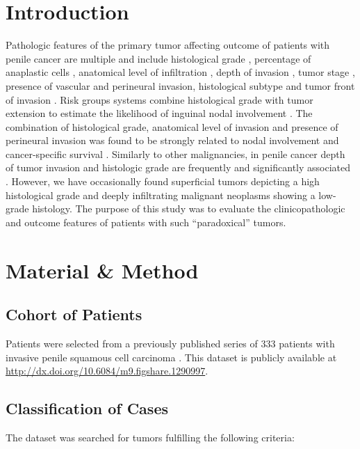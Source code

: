 \documentclass[11pt,letterpaper]{article}\usepackage[]{graphicx}\usepackage[]{color}
\begin{document}
\begin{multicols}{2}

\section*{Introduction}
Pathologic features of the primary tumor affecting outcome of patients with penile cancer are multiple and include histological grade \cite{Chaux2009,Chaux2009b,Velazquez2008}, percentage of anaplastic cells \cite{Slaton2001}, anatomical level of infiltration \cite{Chaux2009}, depth of invasion \cite{Dai2006,Emerson2001}, tumor stage \cite{Slaton2001,Dai2006,Guimaraes2006}, presence of vascular \cite{Slaton2001,Emerson2001,Guimaraes2006,Ficarra2005} and perineural \cite{Chaux2009,Velazquez2008} invasion, histological subtype \cite{Dai2006,Guimaraes2009} and tumor front of invasion \cite{Guimaraes2006}. Risk groups systems combine histological grade with tumor extension to estimate the likelihood of inguinal nodal involvement \cite{Solsona2001,Solsona2004,Hungerhuber2006,Ornellas2008}. The combination of histological grade, anatomical level of invasion and presence of perineural invasion was found to be strongly related to nodal involvement and cancer-specific survival \cite{Chaux2009}. Similarly to other malignancies, in penile cancer depth of tumor invasion and histologic grade are frequently and significantly associated \cite{Guimaraes2009}. However, we have occasionally found superficial tumors depicting a high histological grade and deeply infiltrating malignant neoplasms showing a low-grade histology. The purpose of this study was to evaluate the clinicopathologic and outcome features of patients with such ``paradoxical'' tumors.

\section*{Material \& Method}

\subsection*{Cohort of Patients}
Patients were selected from a previously published series of 333 patients with invasive penile squamous cell carcinoma \cite{Guimaraes2009}. This dataset is publicly available at \url{http://dx.doi.org/10.6084/m9.figshare.1290997}.

\subsection*{Classification of Cases}
The dataset was searched for tumors fulfilling the following criteria:


\end{multicols}
\end{document}
